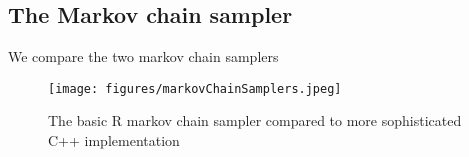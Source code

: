 \subsection*{The Markov chain sampler}
We compare the two markov chain samplers
\begin{figure}[h!]
    \centering
    \texttt{[image: figures/markovChainSamplers.jpeg]}
    \caption{The basic R markov chain sampler compared to more sophisticated C++ implementation}
    \label{markovChainRvRcpp}
\end{figure}
